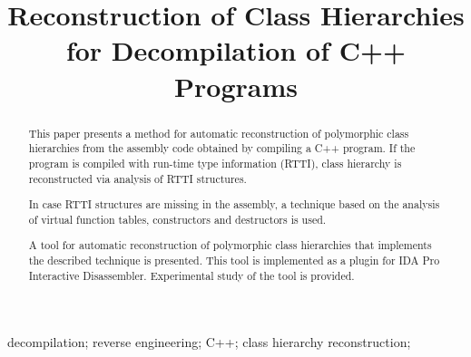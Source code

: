 \documentclass[10pt, conference]{IEEEtran}
\begin{document}
\title{Reconstruction of Class Hierarchies for Decompilation of C++ Programs}

\author{
}

\maketitle

\begin{abstract}
This paper presents a method for automatic reconstruction of
polymorphic class hierarchies from the assembly code obtained by
compiling a C++ program.
If the program is compiled with run-time type information (RTTI),
class hierarchy is reconstructed via analysis of RTTI structures.

In case RTTI structures are missing in the assembly, a technique
based on the analysis of virtual function tables, constructors and
destructors is used.

A tool for automatic reconstruction of polymorphic class hierarchies
that implements the described technique is presented.
This tool is implemented as a plugin for IDA Pro Interactive Disassembler.
Experimental study of the tool is provided.
\end{abstract}

\begin{IEEEkeywords}
decompilation; reverse engineering; C++; class hierarchy reconstruction;
\end{IEEEkeywords}
\end{document}
